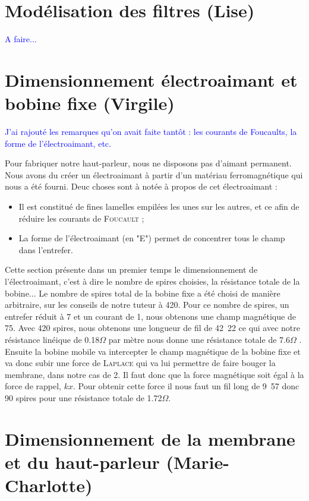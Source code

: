 \documentclass{article}
\begin{document}
\section{Modélisation des filtres (Lise)}

\textcolor{blue}{A faire...}

\section{Dimensionnement électroaimant et bobine fixe (Virgile)}

\textcolor{blue}{J'ai rajouté les remarques qu'on avait faite tantôt : les courants de Foucaults, la forme de l'électroaimant, etc.}

Pour fabriquer notre haut-parleur, nous ne disposons pas d'aimant permanent. Nous avons du créer un électroaimant à partir d'un
matériau ferromagnétique qui nous a été fourni. Deuc choses sont à notée à propos de cet électroaimant :

\begin{itemize}
	\item Il est constitué de fines lamelles empilées les unes sur les autres, et ce afin de réduire les courants de \textsc{Foucault} ;
	\item La forme de l'électroaimant (en "E") permet de concentrer tous le champ dans l'entrefer.
\end{itemize}

 Cette section présente dans un premier temps le dimensionnement de l'électroaimant, c'est à dire le nombre 
de spires choisies, la résistance totale de la bobine...
Le nombre de spires total de la bobine fixe a été choisi de manière arbitraire, sur les conseils de notre tuteur à 420. Pour ce nombre de spires, un entrefer 
réduit à \unit{7}{\milli\meter} et un courant de \unit{1}{\ampere}, nous obtenons une champ magnétique de \unit{75}{\milli\tesla}.
Avec 420 spires, nous obtenons une longueur de fil de \unit{42.22}{\meter} ce qui avec notre résistance linéique de 0.18$\Omega$ par mètre
nous donne une résistance totale de 7.6$\Omega$ .
Ensuite la bobine mobile va intercepter le champ magnétique de la bobine fixe et va donc subir une force de \textsc{Laplace} qui va lui permettre de faire 
bouger la membrane, dans notre cas de \unit{2}{\milli\meter}. Il faut donc que la force magnétique soit égal à la force de rappel,
$kx$. Pour obtenir cette force il nous faut un fil long de \unit{9.57}{\meter} donc 90 spires pour une résistance totale de 1.72$\Omega$.

\section{Dimensionnement de la membrane et du haut-parleur (Marie-Charlotte)}
\end{document}
